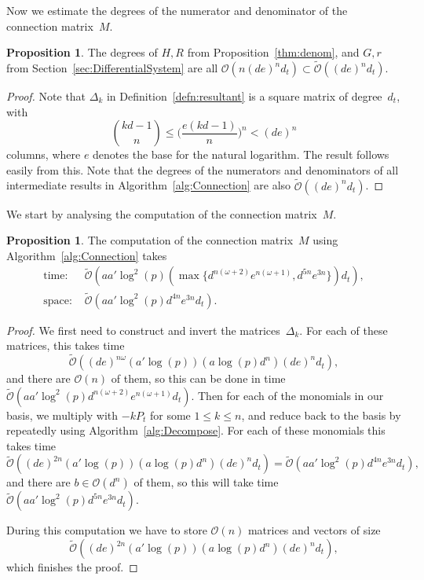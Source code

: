 \documentclass[a4paper,11pt]{article}
\numberwithin{equation}{section}
\providecommand{\BigOh}{\mathcal{O}}          %
\providecommand{\SoftOh}{\tilde{\mathcal{O}}} %
\theoremstyle{definition}
\newtheorem{prop}[thm]{Proposition}
\begin{document}
Now we estimate the degrees of the numerator and denominator of the
connection matrix~$M$.

\begin{prop}
The degrees of $H,R$ from Proposition~\ref{thm:denom}, and
$G,r$ from Section~\ref{sec:DifferentialSystem} are all
$\BigOh(n(de)^n d_t) \subset \SoftOh((de)^n d_t)$.
\end{prop}

\begin{proof}
Note that $\Delta_k$ in Definition~\ref{defn:resultant} is a square matrix 
of degree~$d_t$, with
\[
{kd-1 \choose n} \leq \bigl( \frac{e(kd-1)}{n} \bigr)^n < (de)^n
\]
columns, where $e$ denotes the base for the natural logarithm. The result 
follows easily from this. Note that the degrees of the numerators and 
denominators of all intermediate results in Algorithm~\ref{alg:Connection} 
are also $\SoftOh((de)^n d_t)$.
\end{proof}

We start by analysing the computation of the connection matrix~$M$.
\begin{prop}
The computation of the connection matrix~$M$ using 
Algorithm~\ref{alg:Connection} takes
\begin{align*}
\mbox{time: }  &\SoftOh(a a' \log^2(p) (\max \{ d^{n(\omega+2)} e^{n(\omega+1)}, d^{5n}e^{3n} \}) d_t), \\
\mbox{space: } &\SoftOh(a a' \log^2(p) d^{4n}e^{3n} d_t).
\end{align*}
\end{prop}

\begin{proof}
We first need to construct and invert the matrices~$\Delta_k$. 
For each of these matrices, this takes time
\[
\SoftOh((de)^{n \omega} (a' \log(p)) (a \log(p) d^n) (de)^n d_t),
\] 
and there are $\BigOh(n)$ of them, so this can be done in time 
$\SoftOh(a a' \log^2(p) d^{n(\omega+2)} e^{n(\omega+1)} d_t)$.
Then for each of the monomials in our basis, we  multiply with $-k P_t$ 
for some $1 \leq k \leq n$, and reduce back to the basis by repeatedly 
using Algorithm~\ref{alg:Decompose}. For each of these monomials this 
takes time 
\[
\SoftOh((de)^{2n} (a' \log(p)) (a \log(p) d^n) (de)^n d_t) = 
\SoftOh(a a' \log^2(p) d^{4n}e^{3n} d_t),
\]
and there are $b \in \BigOh(d^n)$ of them, so this will take
time $\SoftOh(a a' \log^2(p) d^{5n}e^{3n} d_t)$.

During this computation we have to store $\BigOh(n)$ matrices 
and vectors of size 
\[
\SoftOh((de)^{2n} (a' \log(p)) (a \log(p) d^n) (de)^n d_t),
\] 
which finishes the proof.
\end{proof}
\end{document}

